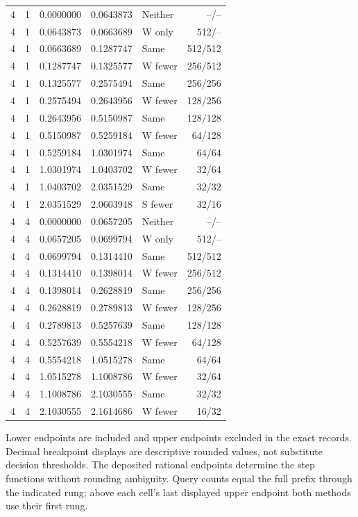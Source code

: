 \begin{longtable}{rrlllr}
4 & 1 & 0.0000000 & 0.0643873 & Neither & --/-- \\
4 & 1 & 0.0643873 & 0.0663689 & W only & 512/-- \\
4 & 1 & 0.0663689 & 0.1287747 & Same & 512/512 \\
4 & 1 & 0.1287747 & 0.1325577 & W fewer & 256/512 \\
4 & 1 & 0.1325577 & 0.2575494 & Same & 256/256 \\
4 & 1 & 0.2575494 & 0.2643956 & W fewer & 128/256 \\
4 & 1 & 0.2643956 & 0.5150987 & Same & 128/128 \\
4 & 1 & 0.5150987 & 0.5259184 & W fewer & 64/128 \\
4 & 1 & 0.5259184 & 1.0301974 & Same & 64/64 \\
4 & 1 & 1.0301974 & 1.0403702 & W fewer & 32/64 \\
4 & 1 & 1.0403702 & 2.0351529 & Same & 32/32 \\
4 & 1 & 2.0351529 & 2.0603948 & S fewer & 32/16 \\
4 & 4 & 0.0000000 & 0.0657205 & Neither & --/-- \\
4 & 4 & 0.0657205 & 0.0699794 & W only & 512/-- \\
4 & 4 & 0.0699794 & 0.1314410 & Same & 512/512 \\
4 & 4 & 0.1314410 & 0.1398014 & W fewer & 256/512 \\
4 & 4 & 0.1398014 & 0.2628819 & Same & 256/256 \\
4 & 4 & 0.2628819 & 0.2789813 & W fewer & 128/256 \\
4 & 4 & 0.2789813 & 0.5257639 & Same & 128/128 \\
4 & 4 & 0.5257639 & 0.5554218 & W fewer & 64/128 \\
4 & 4 & 0.5554218 & 1.0515278 & Same & 64/64 \\
4 & 4 & 1.0515278 & 1.1008786 & W fewer & 32/64 \\
4 & 4 & 1.1008786 & 2.1030555 & Same & 32/32 \\
4 & 4 & 2.1030555 & 2.1614686 & W fewer & 16/32 \\
\end{longtable}
Lower endpoints are included and upper endpoints excluded in the exact records. Decimal breakpoint displays are descriptive rounded values, not substitute decision thresholds. The deposited rational endpoints determine the step functions without rounding ambiguity. Query counts equal the full prefix through the indicated rung; above each cell's last displayed upper endpoint both methods use their first rung.
